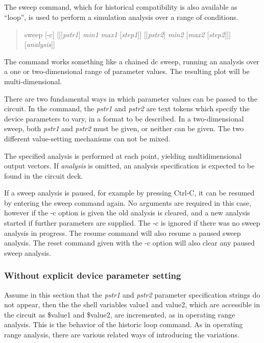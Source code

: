\subsection{}


The {\cb sweep} command, which for historical compatibility is also
available as ``{\cb loop}'', is used to perform a simulation analysis
over a range of conditions.

\begin{quote}\vt
sweep [-c] [[[{\it pstr1\/}] {\it min1} {\it max1\/} [{\it step1\/}]]
 [[{\it pstr2\/}] {\it min2\/} [{\it max2\/} [{\it step2\/}]]]
 [{\it analysis\/}]]
\end{quote}
The command works something like a chained dc sweep, running an
analysis over a one or two-dimensional range of parameter values.  The
resulting plot will be multi-dimensional.

There are two fundamental ways in which parameter values can be passed
to the circuit.  In the command, the {\it pstr1} and {\it pstr2} are
text tokens which specify the device parameters to vary, in a format
to be described.  In a two-dimensional sweep, both {\it pstr1} and
{\it pstr2} must be given, or neither can be given.  The two different
value-setting mechanisms can not be mixed.

The specified analysis is performed at each point, yielding
multidimensional output vectors.  If {\it analysis} is omitted, an
analysis specification is expected to be found in the circuit deck.

If a sweep analysis is paused, for example by pressing {\kb Ctrl-C},
it can be resumed by entering the {\cb sweep} command again.  No
arguments are required in this case, however if the {\vt -c} option is
given the old analysis is cleared, and a new analysis started if
further parameters are supplied.  The {\vt -c} is ignored if there was
no sweep analysis in progress.  The {\cb resume} command will also
resume a paused sweep analysis.  The {\cb reset} command given with
the {\vt -c} option will also clear any paused sweep analysis.

\subsubsection{Without explicit device parameter setting}

Assume in this section that the {\it pstr1} and {\it pstr2} parameter
specification strings do not appear, then the the shell variables {\vt
value1} and {\vt value2}, which are accessible in the circuit as {\vt
\$value1} and {\vt \$value2}, are incremented, as in operating range
analysis.  This is the behavior of the historic {\cb loop} command. 
As in operating range analysis, there are various related ways of
introducing the variations.

